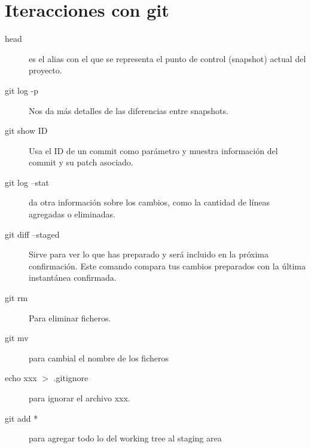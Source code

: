 \newpage 

\section{Iteracciones con git}

\begin{description}
 \item[head] es el alias con el que se representa el punto de control (snapshot)
 actual del proyecto.
 
 \item[git log -p] Nos da más detalles de las diferencias entre snapshots.
 
 \item[git show ID] Usa el ID de un commit como parámetro y muestra información
 del commit y su patch asociado.
 
 \item[git log --stat] da otra información sobre los cambios, como la cantidad
 de líneas agregadas o eliminadas. 

 \item[git diff --staged] Sirve para  ver lo que has preparado y será incluido 
 en la próxima confirmación. Este comando compara tus cambios preparados con la 
 última instantánea confirmada.
 
 \item[git rm] Para eliminar ficheros.
 
 \item[git mv] para cambial el nombre de los ficheros
 
 \item[echo xxx $>$ .gitignore] para ignorar el archivo xxx.
 
 \item[git add *] para agregar todo lo del working tree al staging area
\end{description}


 
